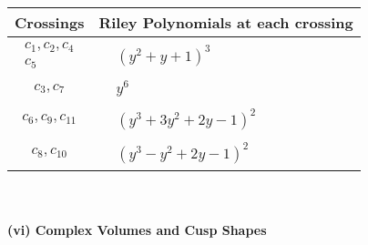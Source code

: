 \documentclass[1p]{elsarticle_modified}
\theoremstyle{definition}
\begin{document}
\begin{tabular}{m{50pt}|m{274pt}}
Crossings & \hspace{64pt}Riley Polynomials at each crossing \\
\hline $$\begin{aligned}c_{1},c_{2},c_{4}\\c_{5}\end{aligned}$$&$\begin{aligned}
&(y^2+y+1)^3
\end{aligned}$\\
\hline $$\begin{aligned}c_{3},c_{7}\end{aligned}$$&$\begin{aligned}
&y^6
\end{aligned}$\\
\hline $$\begin{aligned}c_{6},c_{9},c_{11}\end{aligned}$$&$\begin{aligned}
&(y^3+3 y^2+2 y-1)^2
\end{aligned}$\\
\hline $$\begin{aligned}c_{8},c_{10}\end{aligned}$$&$\begin{aligned}
&(y^3- y^2+2 y-1)^2
\end{aligned}$\\
\hline
\end{tabular}\\~\\
\newpage\flushleft \textbf{(vi) Complex Volumes and Cusp Shapes}
\end{document}
